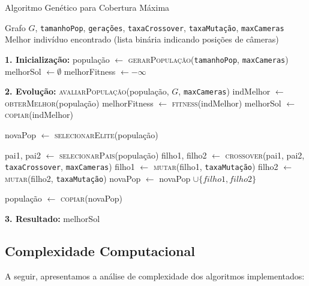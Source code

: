 \documentclass[12pt, a4paper]{report}
\begin{document}
\begin{algorithm}[H]
\caption{Algoritmo Genético para Cobertura Máxima}
\begin{algorithmic}[1]
\Require Grafo $G$, \texttt{tamanhoPop}, \texttt{gerações}, \texttt{taxaCrossover}, \texttt{taxaMutação}, \texttt{maxCameras}
\Ensure Melhor indivíduo encontrado (lista binária indicando posições de câmeras)
\Statex

\State \textbf{1. Inicialização:}
\State população $\leftarrow$ \textsc{gerarPopulação}(\texttt{tamanhoPop}, \texttt{maxCameras})
\State melhorSol $\leftarrow \emptyset$
\State melhorFitness $\leftarrow -\infty$

\Statex
\State \textbf{2. Evolução:}
    \State \textsc{avaliarPopulação}(população, $G$, \texttt{maxCameras}) 
    \State indMelhor $\leftarrow$ \textsc{obterMelhor}(população)
        \State melhorFitness $\leftarrow$ \textsc{fitness}(indMelhor)
        \State melhorSol $\leftarrow$ \textsc{copiar}(indMelhor)
    \EndIf
    
    \State novaPop $\leftarrow$ \textsc{selecionarElite}(população) 
    
        \State pai1, pai2 $\leftarrow$ \textsc{selecionarPais}(população)
        \State filho1, filho2 $\leftarrow$ \textsc{crossover}(pai1, pai2, \texttt{taxaCrossover}, \texttt{maxCameras})
        \State filho1 $\leftarrow$ \textsc{mutar}(filho1, \texttt{taxaMutação})
        \State filho2 $\leftarrow$ \textsc{mutar}(filho2, \texttt{taxaMutação})
        \State novaPop $\leftarrow$ novaPop $\cup \{filho1, filho2\}$
    \EndWhile
    
    \State população $\leftarrow$ \textsc{copiar}(novaPop)
\EndFor

\Statex
\State \textbf{3. Resultado:}
\State \Return melhorSol
\end{algorithmic}
\end{algorithm}

\subsection{Complexidade Computacional}

A seguir, apresentamos a análise de complexidade dos algoritmos implementados:
\end{document}
